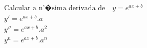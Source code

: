 \begin{ex}
\begin{align}
&\text{Calcular a n'�sima derivada de} \quad y=e^{ax+b}\nonumber\\
&y'=e^{ax+b}.a\nonumber\\
&y''=e^{ax+b}.a^2\nonumber\\
&y^{n}=e^{ax+b}.a^{n}\nonumber
\end{align}
\end{ex}